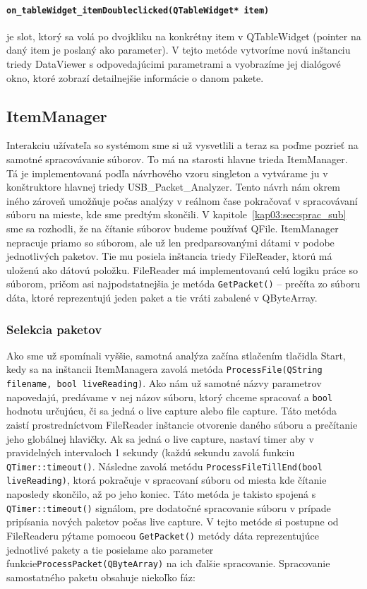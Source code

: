 \paragraph{\texttt{on\_tableWidget\_itemDoubleclicked(QTableWidget* item)}}
\label{kap04:sec:double_click}

je slot, ktorý \newline sa volá po dvojkliku na konkrétny item v QTableWidget (pointer na daný item je poslaný ako parameter). V tejto metóde vytvoríme novú inštanciu triedy DataViewer s odpovedajúcimi parametrami a vyobrazíme jej dialógové okno, ktoré zobrazí detailnejšie informácie o danom pakete.

\subsection{ItemManager}
\label{kap04:sec:item_manager}
Interakciu užívateľa so systémom sme si už vysvetlili a teraz sa poďme pozrieť na samotné spracovávanie súborov. To má na starosti hlavne trieda ItemManager. Tá je implementovaná podľa návrhového vzoru singleton a vytvárame ju v konštruktore hlavnej triedy USB\_Packet\_Analyzer. Tento návrh nám okrem iného zároveň umožňuje počas analýzy v reálnom čase pokračovať v spracovávaní súboru na mieste, kde sme predtým skončili. V kapitole~\ref{kap03:sec:sprac_sub} sme sa rozhodli, že na čítanie súborov budeme používať QFile. ItemManager nepracuje priamo so súborom, ale už len predparsovanými dátami v podobe jednotlivých paketov. Tie mu posiela inštancia triedy FileReader, ktorú má uloženú ako dátovú položku. FileReader má implementovanú celú logiku práce so súborom, pričom asi najpodstatnejšia je metóda \texttt{GetPacket()} -- prečíta zo súboru dáta, ktoré reprezentujú jeden paket a tie vráti zabalené v QByteArray.

\subsubsection{Selekcia paketov}

Ako sme už spomínali vyššie, samotná analýza začína stlačením tlačidla Start, kedy sa na inštancii ItemManagera zavolá metóda \texttt{ProcessFile(QString file\-name, bool liveReading)}. Ako nám už samotné názvy parametrov napovedajú, predávame v nej názov súboru, ktorý chceme spracovať a \texttt{bool} hodnotu určujúcu, či sa jedná o live capture alebo file capture. Táto metóda zaistí prostredníctvom FileReader inštancie otvorenie daného súboru a prečítanie jeho globálnej hlavičky. Ak sa jedná o live capture, nastaví timer aby  v pravidelných intervaloch 1 sekundy (každú sekundu zavolá funkciu \texttt{QTimer::timeout()}. Následne zavolá metódu \texttt{ProcessFileTillEnd(bool liveReading)}, ktorá pokračuje v spracovaní súboru od miesta kde čítanie naposledy skončilo, až po jeho koniec. Táto metóda je takisto spojená s \texttt{QTimer::timeout()} signálom, pre dodatočné spracovanie súboru v prípade pripísania nových paketov počas live capture. V tejto metóde si postupne od FileReaderu pýtame pomocou \texttt{GetPacket()} metódy dáta reprezentujúce jednotlivé pakety a tie posielame ako parameter funkcie\newline \texttt{ProcessPacket(QByteArray)} na ich ďalšie spracovanie. Spracovanie samostatného paketu obsahuje niekoľko fáz:
